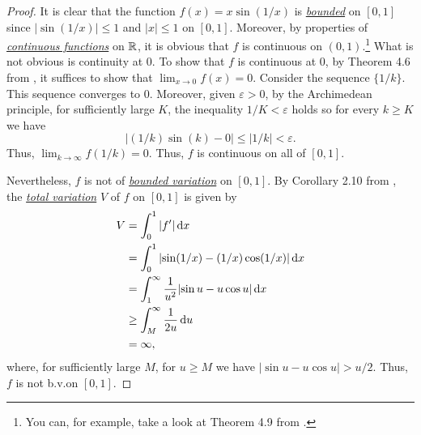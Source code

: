 \begin{proof}
  It is clear that the function $f(x)=x\sin(1/x)$ is
  \href{https://en.wikipedia.org/wiki/Bounded_function}{\emph{bounded}} on
  $[0,1]$ since $|{\sin(1/x)}|\leq 1$ and $|x|\leq 1$ on $[0,1]$. Moreover,
  by properties of
  \href{https://en.wikipedia.org/wiki/Continuous_function#Weierstrass_definition_.28epsilon.E2.80.93delta.29_of_continuous_functions}{\emph{continuous
      functions}} on $\mathbb{R}$, it is obvious that $f$ is continuous on
  $(0,1)$.\footnote{You can, for example, take a look at Theorem 4.9 from
    \cite[Ch.\@ 4, p.\@ 87]{rudin-1}.} What is not obvious is continuity at
  $0$. To show that $f$ is continuous at $0$, by Theorem 4.6 from
  \cite[Ch.\@ 4, p.\@ 86]{rudin-1}, it suffices to show that
  $\lim_{x\to 0}f(x)=0$. Consider the sequence $\{1/k\}$. This sequence
  converges to $0$. Moreover, given $\varepsilon>0$, by the Archimedean
  principle, for sufficiently large $K$, the inequality $1/K<\varepsilon$
  holds so for every $k\geq K$ we have
\begin{equation}
\label{eq:1:1}
\left|(1/k)\sin(k)-0\right|\leq
\left|1/k\right|<\varepsilon.
\end{equation}
Thus, $\lim_{k\to\infty}f(1/k)=0$. Thus, $f$ is continuous on all of
$[0,1]$.

Nevertheless, $f$ is not of
\href{https://en.wikipedia.org/wiki/Bounded_variation}{\emph{bounded
    variation}} on $[0,1]$. By Corollary 2.10 from \cite[Ch.\@ 2, p.\@
23]{wheeden-zygmund}, the
\href{https://en.wikipedia.org/wiki/Total_variation}{\emph{total
    variation}} $V$ of $f$ on $[0,1]$ is given by
\begin{equation}
\label{eq:1:2}
\begin{aligned}
V&=\int_0^1|f'|\mathop{}\!\mathrm{d} x\\
&=\int_0^1|{\sin(1/x)-(1/x)\cos(1/x)}|\mathop{}\!\mathrm{d} x\\
&=\int_1^\infty\frac{1}{u^2}|{\sin u-u\cos u}|\mathop{}\!\mathrm{d} x\\
&\geq\int_M^\infty \frac{1}{2u}\mathop{}\!\mathrm{d} u\\
&=\infty,
\end{aligned}
\end{equation}
where, for sufficiently large $M$, for $u\geq M$ we have $|{\sin u- u\cos
  u}|>u/2$. Thus, $f$ is not b.v.\@ on $[0,1]$.
\end{proof}

